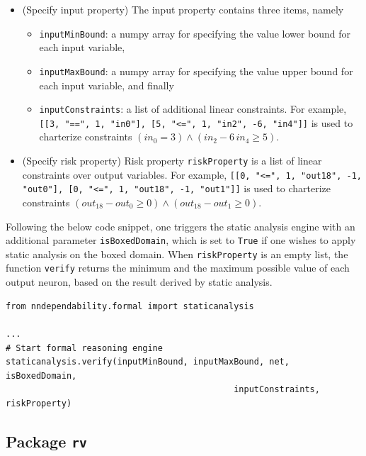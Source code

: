 \documentclass{article}
\begin{document}
\begin{itemize}
    
     \item (Specify input property) The input property contains three items, namely
     \begin{itemize}
         \item \texttt{inputMinBound}: a numpy array for specifying the value lower bound for each input variable, 
         \item \texttt{inputMaxBound}: a numpy array for specifying the value upper bound for each input variable, and finally
         \item \texttt{inputConstraints}: a list of additional linear constraints. For example, \texttt{[[3, "==", 1, "in0"], [5, "<=", 1, "in2", -6, "in4"]]} is used to charterize constraints $(in_{0} = 3) \wedge  (in_2 -6 \, in_4 \geq 5)$.
     \end{itemize}
     \item (Specify risk property) Risk property \texttt{riskProperty} is a list of linear constraints over output variables. For example, \texttt{[[0, "<=", 1, "out18", -1, "out0"], [0, "<=", 1, "out18", -1, "out1"]]}  is used to charterize constraints $(out_{18} - out_{0} \geq 0) \wedge  (out_{18} - out_{1} \geq 0)$. 
\end{itemize}

Following the below code snippet, one triggers the static analysis engine with an additional parameter \texttt{isBoxedDomain}, which is set to \texttt{True} if one wishes to apply static analysis on the boxed domain. When \texttt{riskProperty} is an empty list, the function \texttt{verify} returns the minimum and the maximum possible value of each output neuron, based on the result derived by static analysis. 


\begin{small}
\color{blue}
\begin{verbatim}
from nndependability.formal import staticanalysis

...
# Start formal reasoning engine
staticanalysis.verify(inputMinBound, inputMaxBound, net, isBoxedDomain, 
                                             inputConstraints, riskProperty)

\end{verbatim}
\end{small}


\subsection{Package \texttt{rv}}
\end{document}
